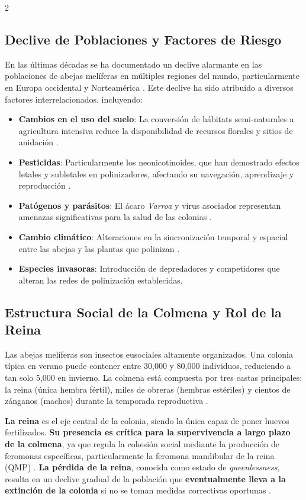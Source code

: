 \documentclass[12pt]{report}
\newenvironment{tightmulticols}{%
  \begin{multicols}{2}
  \setlength{\parskip}{1.2pt}
  \linespread{1}\selectfont
}{%
  \end{multicols}
}
\begin{document}
\begin{tightmulticols}
\subsection{Declive de Poblaciones y Factores de Riesgo}

\noindent En las últimas décadas se ha documentado un declive alarmante en las poblaciones de abejas melíferas en múltiples regiones del mundo, particularmente en Europa occidental y Norteamérica \cite{potts2016}. Este declive ha sido atribuido a diversos factores interrelacionados, incluyendo:

\begin{itemize}
    \item \textbf{Cambios en el uso del suelo}: La conversión de hábitats semi-naturales a agricultura intensiva reduce la disponibilidad de recursos florales y sitios de anidación \cite{potts2016}.
    \item \textbf{Pesticidas}: Particularmente los neonicotinoides, que han demostrado efectos letales y subletales en polinizadores, afectando su navegación, aprendizaje y reproducción \cite{potts2016}.
    \item \textbf{Patógenos y parásitos}: El ácaro \textit{Varroa} y virus asociados representan amenazas significativas para la salud de las colonias \cite{potts2016}.
    \item \textbf{Cambio climático}: Alteraciones en la sincronización temporal y espacial entre las abejas y las plantas que polinizan \cite{potts2016}.
    \item \textbf{Especies invasoras}: Introducción de depredadores y competidores que alteran las redes de polinización establecidas.
\end{itemize}

\subsection{Estructura Social de la Colmena y Rol de la Reina}

\noindent Las abejas melíferas son insectos eusociales altamente organizados. Una colonia típica en verano puede contener entre 30,000 y 80,000 individuos, reduciendo a tan solo 5,000 en invierno. La colmena está compuesta por tres castas principales: la reina (única hembra fértil), miles de obreras (hembras estériles) y cientos de zánganos (machos) durante la temporada reproductiva \cite{ruvinga2021}.

\par \textbf{La reina} es el eje central de la colonia, siendo la única capaz de poner huevos fertilizados. \textbf{Su presencia es crítica para la supervivencia a largo plazo de la colmena}, ya que regula la cohesión social mediante la producción de feromonas específicas, particularmente la feromona mandibular de la reina (QMP) \cite{ruvinga2023}. \textbf{La pérdida de la reina}, conocida como estado de \textit{queenlessness}, resulta en un declive gradual de la población que \textbf{eventualmente lleva a la extinción de la colonia} si no se toman medidas correctivas oportunas \cite{ruvinga2023}.


\end{tightmulticols}
\end{document}
